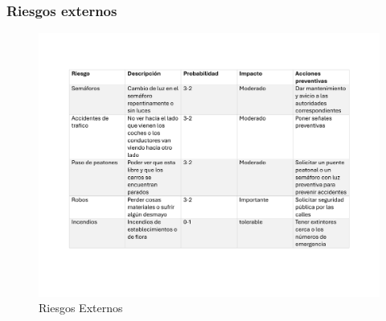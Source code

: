     \subsubsection{Riesgos externos}
    \begin{figure}[H]
        \centering
        \includegraphics[scale=0.3]{13/img/riesgoExternos.pdf}
        \caption{Riesgos Externos}
    \end{figure}
